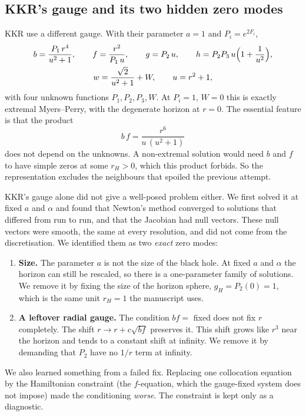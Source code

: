 \documentclass[11pt,a4paper]{article}
\begin{document}
\subsection{KKR's gauge and its two hidden zero modes}

KKR use a different gauge. With their parameter $a=1$ and $P_i=e^{2F_i}$,
\begin{equation}
\begin{gathered}
  b=\frac{P_1\,r^4}{u^2+1},\qquad f=\frac{r^2}{P_1\,u},\qquad g=P_2\,u,\qquad
  h=P_2P_3\,u\Bigl(1+\frac{1}{u^2}\Bigr),\\
  w=\frac{\sqrt2}{u^2+1}+W,\qquad u=r^2+1 ,
\end{gathered}
\label{eq:kkr}
\end{equation}
with four unknown functions $P_1,P_2,P_3,W$. At $P_i=1$, $W=0$ this is exactly
extremal Myers--Perry, with the degenerate horizon at $r=0$. The essential
feature is that the product
\begin{equation}
  b\,f=\frac{r^6}{u\,(u^2+1)}
\end{equation}
does not depend on the unknowns. A non-extremal solution would need $b$ and $f$
to have simple zeros at some $r_H>0$, which this product forbids. So the
representation excludes the neighbours that spoiled the previous attempt.

KKR's gauge alone did not give a well-posed problem either. We first solved it at
fixed $a$ and $\alpha$ and found that Newton's method converged to solutions
that differed from run to run, and that the Jacobian had null vectors. These null
vectors were smooth, the same at every resolution, and did not come from the
discretisation. We identified them as two \emph{exact} zero modes:
\begin{enumerate}
\item \textbf{Size.} The parameter $a$ is not the size of the black hole. At
fixed $a$ and $\alpha$ the horizon can still be rescaled, so there is a
one-parameter family of solutions. We remove it by fixing the size of the
horizon sphere, $g_H=P_2(0)=1$, which is the same unit $r_H=1$ the manuscript
uses.
\item \textbf{A leftover radial gauge.} The condition $bf=$ fixed does not fix
$r$ completely. The shift $r\to r+c\sqrt{bf}$ preserves it. This shift grows
like $r^3$ near the horizon and tends to a constant shift at infinity. We remove
it by demanding that $P_2$ have no $1/r$ term at infinity.
\end{enumerate}
We also learned something from a failed fix. Replacing one collocation equation
by the Hamiltonian constraint (the $f$-equation, which the gauge-fixed system
does not impose) made the conditioning \emph{worse}. The constraint is kept
only as a diagnostic.
\end{document}
